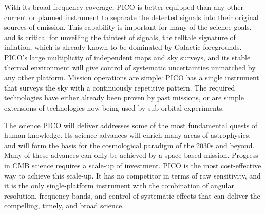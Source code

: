\documentclass[PICOAPC.tex]{subfiles}
\begin{document}



With its broad frequency coverage, PICO is better equipped than any other current or planned instrument to separate the detected signals into their original sources of emission.  This capability is important for many of the science goals, and is critical for unveiling the faintest of signals, the telltale signature of inflation, which is already known to be dominated by Galactic foregrounds. 
PICO's large multiplicity of independent maps and sky surveys, and its stable thermal environment will give control of systematic uncertainties unmatched by any other platform. 
Mission operations are simple: PICO has a single instrument that surveys the sky with a continuously repetitive pattern.  
The required technologies have either already been proven by past missions, or are simple extensions of technologies now being used by sub-orbital experiments. 
 

The science PICO will deliver addresses some of the most fundamental quests of human knowledge. Its science advances will enrich many areas of astrophysics, and will form the basis for the cosmological paradigm of the 2030s and beyond.  Many of these advances can only be achieved by a space-based mission. Progress in CMB science requires a scale-up of investment. PICO is the most cost-effective way to achieve this scale-up. It has no competitor in terms of raw sensitivity, and it is the only single-platform instrument with the combination of angular resolution, frequency bands, and control of systematic effects that can deliver the compelling, timely, and broad science. 
\end{document}
